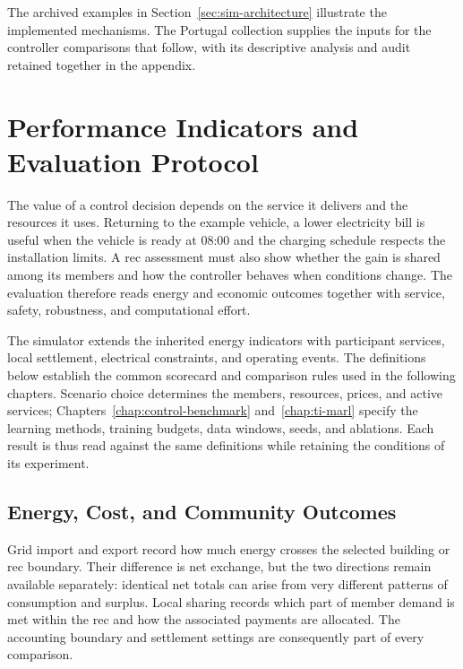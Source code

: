 The archived examples in Section~\ref{sec:sim-architecture} illustrate the implemented mechanisms. The Portugal collection supplies the inputs for the controller comparisons that follow, with its descriptive analysis and audit retained together in the appendix.

\section{Performance Indicators and Evaluation Protocol}
\label{sec:sim-evaluation}

The value of a control decision depends on the service it delivers and the resources it uses. Returning to the example vehicle, a lower electricity bill is useful when the vehicle is ready at 08:00 and the charging schedule respects the installation limits. A \gls{rec} assessment must also show whether the gain is shared among its members and how the controller behaves when conditions change. The evaluation therefore reads energy and economic outcomes together with service, safety, robustness, and computational effort.

The simulator extends the inherited energy indicators with participant services, local settlement, electrical constraints, and operating events. The definitions below establish the common scorecard and comparison rules used in the following chapters. Scenario choice determines the members, resources, prices, and active services; Chapters~\ref{chap:control-benchmark} and~\ref{chap:ti-marl} specify the learning methods, training budgets, data windows, seeds, and ablations. Each result is thus read against the same definitions while retaining the conditions of its experiment.

\subsection{Energy, Cost, and Community Outcomes}

Grid import and export record how much energy crosses the selected building or \gls{rec} boundary. Their difference is net exchange, but the two directions remain available separately: identical net totals can arise from very different patterns of consumption and surplus. Local sharing records which part of member demand is met within the \gls{rec} and how the associated payments are allocated. The accounting boundary and settlement settings are consequently part of every comparison.

